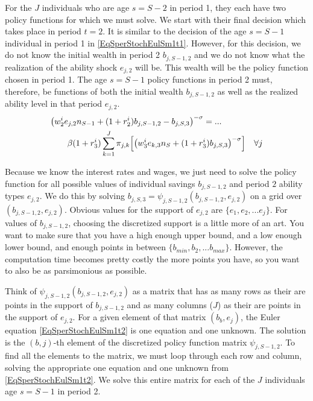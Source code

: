 \documentclass[letterpaper,12pt]{article}
\theoremstyle{definition}
\numberwithin{equation}{section}
\numberwithin{exercise}{section}
\begin{document}
\begin{spacing}{1.5}
      For the $J$ individuals who are age $s=S-2$ in period 1, they each have two policy functions for which we must solve. We start with their final decision which takes place in period $t=2$. It is similar to the decision of the age $s=S-1$ individual in period 1 in \eqref{EqSperStochEulSm1t1}. However, for this decision, we do not know the initial wealth in period 2 $b_{j,S-1,2}$ and we do not know what the realization of the ability shock $e_{j,2}$ will be. This wealth will be the policy function chosen in period 1. The age $s=S-1$ policy functions in period 2 must, therefore, be functions of both the initial wealth $b_{j,S-1,2}$ as well as the realized ability level in that period $e_{j,2}$.
      \begin{equation}\label{EqSperStochEulSm1t2}
         \begin{split}
            &\bigl(w_2^{i}e_{j,2}n_{S-1} + (1+r_2^i)b_{j,S-1,2} - b_{j,S,3}\bigr)^{-\sigma} = ... \\
            &\qquad \beta (1+r_3^i)\sum_{k=1}^J\pi_{j,k}\Bigl[\bigl(w_3^{i}e_{k,3}n_{S} + (1+r_3^i)b_{j,S,3}\bigr)^{-\sigma}\Bigr] \quad\forall j
         \end{split}
      \end{equation}

      Because we know the interest rates and wages, we just need to solve the policy function for all possible values of individual savings $b_{j,S-1,2}$ and period $2$ ability types $e_{j,2}$. We do this by solving $b_{j,S,3}=\psi_{j,S-1,2}\left(b_{j,S-1,2},e_{j,2}\right)$ on a grid over $\left(b_{j,S-1,2},e_{j,2}\right)$. Obvious values for the support of $e_{j,2}$ are $\{e_1,e_2,...e_j\}$. For values of $b_{j,S-1,2}$, choosing the discretized support is a little more of an art. You want to make sure that you have a high enough upper bound, and a low enough lower bound, and enough points in between $\{b_{min},b_2,...b_{max}\}$. However, the computation time becomes pretty costly the more points you have, so you want to also be as parsimonious as possible.

      Think of $\psi_{j,S-1,2}\left(b_{j,S-1,2},e_{j,2}\right)$ as a matrix that has as many rows as their are points in the support of $b_{j,S-1,2}$ and as many columns ($J$) as their are points in the support of $e_{j,2}$. For a given element of that matrix $(b_b,e_j)$, the Euler equation \eqref{EqSperStochEulSm1t2} is one equation and one unknown. The solution is the $(b,j)$-th element of the discretized policy function matrix $\psi_{j,S-1,2}$. To find all the elements to the matrix, we must loop through each row and column, solving the appropriate one equation and one unknown from \eqref{EqSperStochEulSm1t2}. We solve this entire matrix for each of the $J$ individuals age $s=S-1$ in period 2.


\end{spacing}
\end{document}
